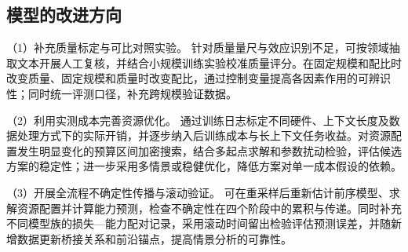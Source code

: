 \documentclass[bwprint]{gmcmthesis}
\numberwithin{equation}{section}
\numberwithin{figure}{section}
\numberwithin{table}{section}
\begin{document}
    \subsection{模型的改进方向}
    （1）补充质量标定与可比对照实验。
    针对质量量尺与效应识别不足，可按领域抽取文本开展人工复核，并结合小规模训练实验校准质量评分。在固定规模和配比时改变质量、固定规模和质量时改变配比，通过控制变量提高各因素作用的可辨识性；同时统一评测口径，补充跨规模验证数据。
    
    （2）利用实测成本完善资源优化。
    通过训练日志标定不同硬件、上下文长度及数据处理方式下的实际开销，并逐步纳入后训练成本与长上下文任务收益。对资源配置发生明显变化的预算区间加密搜索，结合多起点求解和参数扰动检验，评估候选方案的稳定性；进一步采用多情景或稳健优化，降低方案对单一成本假设的依赖。
    
    （3）开展全流程不确定性传播与滚动验证。
    可在重采样后重新估计前序模型、求解资源配置并计算能力预测，检查不确定性在四个阶段中的累积与传递。同时补充不同模型族的损失—能力配对记录，采用滚动时间留出检验评估预测误差，并随新增数据更新桥接关系和前沿锚点，提高情景分析的可靠性。

\clearpage




 
\end{document}
